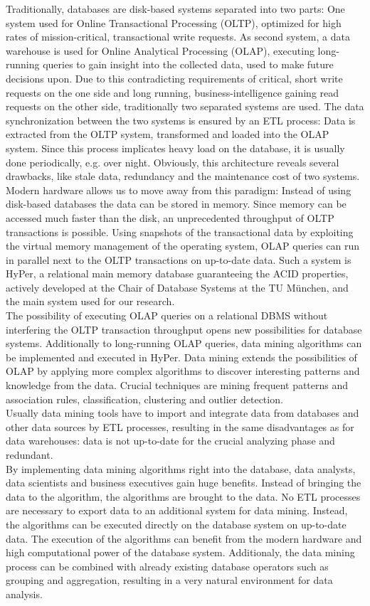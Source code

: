 Traditionally, databases are disk-based systems separated into two parts: One system used for Online Transactional Processing (OLTP), optimized for high rates of mission-critical, transactional write requests. As second system, a data warehouse is used for Online Analytical Processing (OLAP), executing long-running queries to gain insight into the  collected data, used to make future decisions upon. Due to this contradicting requirements of critical, short write requests on the one side and long running, business-intelligence gaining read requests on the other side, traditionally two separated systems are used. The data synchronization between the two systems is ensured by an ETL process: Data is extracted from the OLTP system, transformed and loaded into the OLAP system. Since this process implicates heavy load on the database, it is usually done periodically, e.g. over night. Obviously, this architecture reveals several drawbacks, like stale data, redundancy and the maintenance cost of two systems.
\\
Modern hardware allows us to move away from this paradigm: Instead of using disk-based databases the data can be stored in memory. Since memory can be accessed much faster than the disk, an unprecedented throughput of OLTP transactions is possible. Using snapshots of the transactional data by exploiting the virtual memory management of the operating system, OLAP queries can run in parallel next to the OLTP transactions on up-to-date data. Such a system is HyPer, a relational main memory database guaranteeing the ACID properties, actively developed at the Chair of Database Systems at the TU München, and the main system used for our research. 
\\
The possibility of executing OLAP queries on a relational DBMS without interfering the OLTP transaction throughput opens new possibilities for database systems. Additionally to long-running OLAP queries, data mining algorithms can be implemented and executed in HyPer. Data mining extends the possibilities of OLAP by applying more complex algorithms to discover interesting patterns and knowledge from the data. Crucial techniques are mining frequent patterns and association rules, classification, clustering and outlier detection.
\\
Usually data mining tools have to import and integrate data from databases and other data sources by ETL processes, resulting in the same disadvantages as for data warehouses: data is not up-to-date for the crucial analyzing phase and redundant. 
\\
By implementing data mining algorithms right into the database, data analysts, data scientists and business executives gain huge benefits. Instead of bringing the data to the algorithm, the algorithms are brought to the data. No ETL processes are necessary to export data to an additional system for data mining. Instead, the algorithms can be executed directly on the database system on up-to-date data. The execution of the algorithms can benefit from the modern hardware and high computational power of the database system. Additionaly, the data mining process can be combined with already existing database operators such as grouping and aggregation, resulting in a very natural environment for data analysis.


